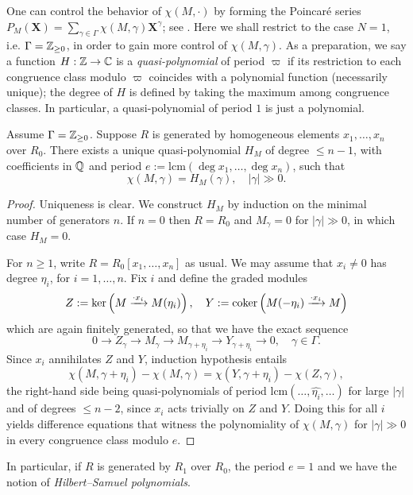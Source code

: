 One can control the behavior of $\chi(M, \cdot)$ by forming the Poincaré series $P_M(\mathbf{X}) = \sum_{\gamma \in \Gamma} \chi(M,\gamma) \mathbf{X}^\gamma$; see \cite[6.D]{BG09}. Here we shall restrict to the case $N=1$, i.e. $\Gamma = \mathbb{Z}_{\geq 0}$, in order to gain more control of $\chi(M,\gamma)$. As a preparation, we say a function $H: \mathbb{Z} \to \mathbb{C}$ is a \emph{quasi-polynomial} of period $\varpi$ if its restriction to each congruence class modulo $\varpi$ coincides with a polynomial function (necessarily unique); the degree of $H$ is defined by taking the maximum among congruence classes. In particular, a quasi-polynomial of period $1$ is just a polynomial.

\begin{theorem}
	Assume $\Gamma = \mathbb{Z}_{\geq 0}$. Suppose $R$ is generated by homogeneous elements $x_1, \ldots, x_n$ over $R_0$. There exists a unique quasi-polynomial $H_M$ of degree $\leq n-1$, with coefficients in $\mathbb{Q}$ and period $e := \mathrm{lcm}(\deg x_1, \ldots, \deg x_n)$, such that
	\[ \chi(M, \gamma) = H_M(\gamma), \quad |\gamma| \gg 0. \]
\end{theorem}
\begin{proof}
	Uniqueness is clear. We construct $H_M$ by induction on the minimal number of generators $n$. If $n=0$ then $R = R_0$ and $M_\gamma = 0$ for $|\gamma| \gg 0$, in which case $H_M = 0$.

	For $n \geq 1$, write $R = R_0[x_1, \ldots, x_n]$ as usual. We may assume that $x_i \neq 0$ has degree $\eta_i$, for $i=1,\ldots,n$. Fix $i$ and define the graded modules
	\[ Z := \operatorname{ker}\left( M \xrightarrow{\cdot x_i} M(\eta_i) \right), \quad Y := \operatorname{coker}\left( M(-\eta_i) \xrightarrow{\cdot x_i} M \right) \]
	which are again finitely generated, so that we have the exact sequence
	\[ 0 \to Z_\gamma \to M_\gamma \to M_{\gamma + \eta_i} \to Y_{\gamma + \eta_i} \to 0, \quad \gamma \in \Gamma. \]
	Since $x_i$ annihilates $Z$ and $Y$, induction hypothesis entails
	\[ \chi(M, \gamma+\eta_i) - \chi(M, \gamma) = \chi(Y, \gamma+\eta_i) - \chi(Z, \gamma), \]
	the right-hand side being quasi-polynomials of period $\text{lcm}(\ldots, \widehat{\eta_i}, \ldots)$ for large $|\gamma|$ and of degrees $\leq n-2$, since $x_i$ acts trivially on $Z$ and $Y$. Doing this for all $i$ yields difference equations that witness the polynomiality of $\chi(M, \gamma)$ for $|\gamma| \gg 0$ in every congruence class modulo $e$.
\end{proof}
In particular, if $R$ is generated by $R_1$ over $R_0$, the period $e=1$ and we have the notion of \emph{Hilbert--Samuel polynomials}.

